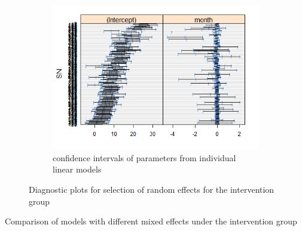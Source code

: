 \begin{figure}[H]
\begin{subfigure}{.33\textwidth}
  \includegraphics[width=1\linewidth]{../../plots/interval_treatment.png}
  \caption{confidence intervals of parameters from individual linear models}
\end{subfigure}
\caption{Diagnostic plots for selection of random effects for the intervention group}
\label{fig:diagnostic.treatment}
\end{figure}

\begin{table}[H]
\begin{minipage}{0.5\textwidth}
\centering
{}
\caption{Comparison of models with different mixed effects under the intervention group}
\label{tab:model.comp.treatmemt.me}
\end{minipage}
\hfill
\begin{minipage}{0.5\textwidth}
\centering
{}
\caption{P values of Likelihood Ratio tests between models with different mixed effects under the intervention group}
\label{tab:model.comp.treatment.me.lrt}
\end{minipage}
\end{table}

